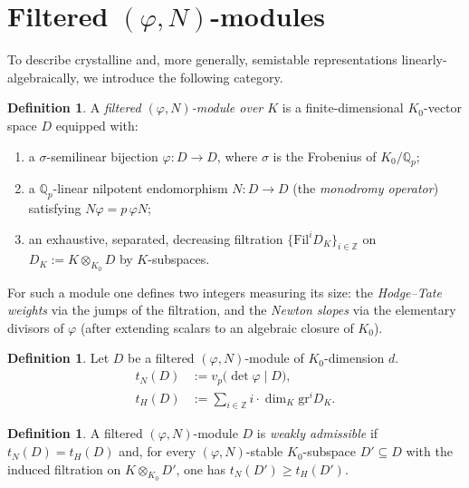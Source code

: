 \documentclass[10pt]{amsbook}
\theoremstyle{definition}
\newtheorem{definition}[theorem]{Definition}
\theoremstyle{remark}
\newcommand{\Qp}{\mathbb{Q}_p}
\begin{document}
\section{Filtered \texorpdfstring{$(\varphi,N)$}{(phi,N)}-modules}
\label{sec:filtered-modules}

To describe crystalline and, more generally, semistable representations linearly-algebraically,
we introduce the following category.

\begin{definition}\label{def:phiN-module}
A \emph{filtered $(\varphi, N)$-module over $K$} is a finite-dimensional $K_0$-vector space
$D$ equipped with:
\begin{enumerate}[label=\textup{(\alph*)}]
  \item a $\sigma$-semilinear bijection $\varphi \colon D \to D$, where $\sigma$ is the
    Frobenius of $K_0/\Qp$;
  \item a $\Qp$-linear nilpotent endomorphism $N \colon D \to D$ (the \emph{monodromy
    operator}) satisfying $N \varphi = p \, \varphi N$;
  \item an exhaustive, separated, decreasing filtration $\{\mathrm{Fil}^i D_K\}_{i \in
    \mathbb{Z}}$ on $D_K := K \otimes_{K_0} D$ by $K$-subspaces.
\end{enumerate}
\end{definition}

For such a module one defines two integers measuring its size: the \emph{Hodge--Tate weights}
via the jumps of the filtration, and the \emph{Newton slopes} via the elementary divisors of
$\varphi$ (after extending scalars to an algebraic closure of $K_0$).

\begin{definition}\label{def:tn-th}
Let $D$ be a filtered $(\varphi, N)$-module of $K_0$-dimension $d$.
\begin{align*}
  t_N(D) &:= v_p\bigl(\det \varphi \mid D\bigr), \\
  t_H(D) &:= \sum_{i \in \mathbb{Z}} i \cdot \dim_K \mathrm{gr}^i D_K.
\end{align*}
\end{definition}

\begin{definition}\label{def:admissible}
A filtered $(\varphi,N)$-module $D$ is \emph{weakly admissible} if $t_N(D) = t_H(D)$ and,
for every $(\varphi,N)$-stable $K_0$-subspace $D' \subseteq D$ with the induced filtration on
$K \otimes_{K_0} D'$, one has $t_N(D') \geq t_H(D')$.
\end{definition}
\end{document}
